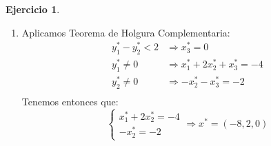 \documentclass[a4paper,oneside,12pt]{amsart}
\newcommand{\xopt}{x^{*}}
\newcommand{\yopt}{y^{*}}
\theoremstyle{definition}
\newtheorem{quest}{Ejercicio}
\begin{document}
\begin{quest}
\begin{enumerate}[label=\alph*)]
                  \textbf{Fase II:} escribimos el primer diccionario de la Fase II y resolvemos
                    \[
                    \begin{array}{rclll}
                    y_1 & =  &1 &+1/2y_2 &-1/2y_3\\
                    w_1 & =  &2 &-1/2y_2 &-1/2y_3\\
                    w_2 & =  &1 &+1/2y_2 &+1/2y_3\\\hline
                    z &= &4 &+4y_2 &-y_3\\
                    \end{array}
                    \]
                    \vspace{1cm}
                    \[
                    \begin{array}{rclll}
                    y_1 & =  &3 &-y_3 &-w_1\\
                    w_2 & =  &3 &  &-w_1\\
                    y_2 & =  &4 &-y_3 &-2w_1\\\hline
                    z &= &20 &-5y_3 &-8w_1\\
                    \end{array}
                    \]
                    \vspace{1cm}
                    \textbf{Solución del dual:} $y^\ast = (3, 4, 0)$
                  \item Aplicamos Teorema de Holgura Complementaria:
                    \[
                  \begin{array}{rl}
                      y_1^\ast - y_2^\ast < 2 & \Rightarrow x_3^\ast = 0 \\
                      y_1^\ast \neq 0 & \Rightarrow \xopt_1+2\xopt_2+\xopt_3 = -4 \\
                      \yopt_2 \neq 0 & \Rightarrow -\xopt_2 - \xopt_3 = -2 \\
                  \end{array}
                  \]
                  Tenemos entonces que:
                  \[
                      \begin{cases}
                          \xopt_1+2\xopt_2= -4 \\
                          -\xopt_2 = -2
                      \end{cases}
                      \Rightarrow \xopt = (-8,2, 0)
                  \]
        \end{enumerate}
    \end{quest}
\end{document}
